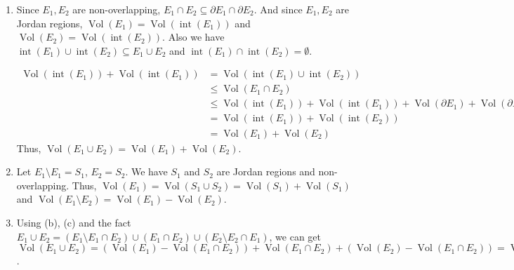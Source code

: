 \documentclass[12pt]{article}
\DeclareMathOperator{\volume}{Vol}
\DeclareMathOperator{\interior}{int}
\newcommand{\boundary}{\partial}
\begin{document}
\begin{enumerate}
\begin{enumerate}
        \item Since $E_1, E_2$ are non-overlapping, $E_1 \cap E_2 \subseteq \boundary E_1 \cap \boundary E_2$.
        And since $E_1, E_2$ are Jordan regions, $\volume(E_1) = \volume(\interior(E_1))$ and $\volume(E_2) = \volume(\interior(E_2))$.
        Also we have $\interior(E_1) \cup \interior(E_2) \subseteq E_1 \cup E_2$ and $\interior(E_1) \cap \interior(E_2) = \emptyset$.

        \begin{align*}
            \volume(\interior(E_1)) + \volume(\interior(E_1)) &= \volume(\interior(E_1) \cup \interior(E_2))\\
            &\leq \volume(E_1 \cap E_2)\\
            &\leq \volume(\interior(E_1)) + \volume(\interior(E_1)) + \volume(\boundary E_1) + \volume(\boundary E_2)\\
            &= \volume(\interior(E_1)) + \volume(\interior(E_2))\\
            &= \volume(E_1) + \volume(E_2)
        \end{align*}
        Thus, $\volume(E_1\cup E_2) = \volume(E_1) + \volume(E_2)$.

        \item Let $E_1\setminus E_1 = S_1$, $E_2 = S_2$.
        We have $S_1$ and $S_2$ are Jordan regions and non-overlapping.
        Thus, $\volume(E_1) = \volume(S_1 \cup S_2) = \volume(S_1) + \volume(S_1)$ and 
        $\volume(E_1\setminus E_2) = \volume(E_1) - \volume(E_2)$.

        \item Using (b), (c) and the fact $E_1 \cup E_2 = (E_1 \setminus E_1 \cap E_2) \cup (E_1 \cap E_2) \cup (E_2 \setminus E_2\cap E_1)$,
        we can get $\volume(E_1 \cup E_2) = (\volume(E_1) - \volume(E_1 \cap E_2)) + \volume(E_1 \cap E_2) + (\volume(E_2) - \volume(E_1 \cap E_2)) = \volume(E_1) + \volume(E_2) - \volume(E_1\cap E_2)$.
    \end{enumerate}
\end{enumerate}
\end{document}
